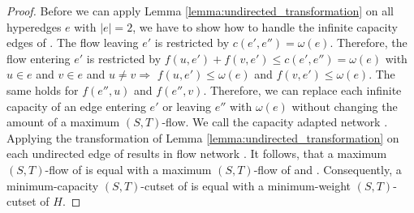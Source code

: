 \begin{proof}

Before we can apply Lemma \ref{lemma:undirected_transformation} on all hyperedges $e$
with $|e| = 2$, we have to show how to handle the infinite capacity edges of .
The flow leaving $e'$ is restricted by $c(e',e'') = \omega(e)$. Therefore, the flow entering
$e'$ is restricted by $f(u,e') + f(v,e') \le c(e',e'') = \omega(e)$ with $u \in e$ and
$v \in e$ and $u \neq v \Rightarrow$ $f(u,e') \le \omega(e)$ and $f(v,e') \le \omega(e)$.
The same holds for $f(e'',u)$ and $f(e'',v)$. Therefore, we can replace each infinite 
capacity of an edge entering $e'$ or leaving $e''$ with $\omega(e)$ without changing the amount
of a maximum $(S,T)$-flow. We call the capacity adapted network .\\
Applying the transformation of Lemma \ref{lemma:undirected_transformation} on each undirected
edge of  results in flow network . It follows, that a maximum $(S,T)$-flow of  is equal
with a maximum $(S,T)$-flow of  and . Consequently, a minimum-capacity
$(S,T)$-cutset of  is equal with a minimum-weight $(S,T)$-cutset of $H$.


\end{proof}
